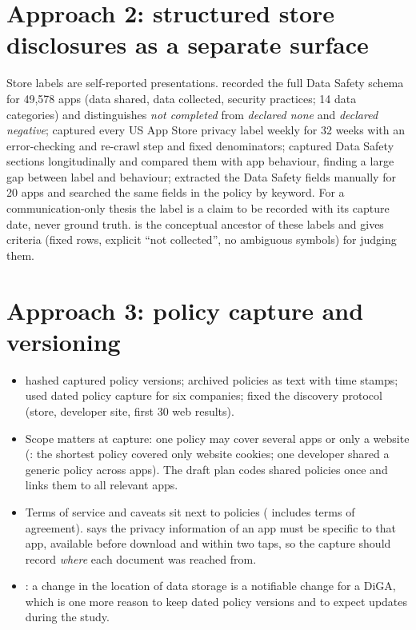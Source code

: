 \section{Approach 2: structured store disclosures as a separate surface}
Store labels are self-reported presentations.  recorded the full Data Safety schema for 49{,}578 apps (data shared, data collected, security practices; 14 data categories) and distinguishes \emph{not completed} from \emph{declared none} and \emph{declared negative};  captured every US App Store privacy label weekly for 32 weeks with an error-checking and re-crawl step and fixed denominators;  captured Data Safety sections longitudinally and compared them with app behaviour, finding a large gap between label and behaviour;  extracted the Data Safety fields manually for 20 apps and searched the same fields in the policy by keyword. For a communication-only thesis the label is a claim to be recorded with its capture date, never ground truth.  is the conceptual ancestor of these labels and gives criteria (fixed rows, explicit ``not collected'', no ambiguous symbols) for judging them.

\section{Approach 3: policy capture and versioning}
\begin{itemize}
\item {} hashed captured policy versions;  archived policies as text with time stamps;  used dated policy capture for six companies;  fixed the discovery protocol (store, developer site, first 30 web results).
\item Scope matters at capture: one policy may cover several apps or only a website (: the shortest policy covered only website cookies; one developer shared a generic policy across apps). The draft plan codes shared policies once and links them to all relevant apps.
\item Terms of service and caveats sit next to policies ( includes terms of agreement).  says the privacy information of an app must be specific to that app, available before download and within two taps, so the capture should record \emph{where} each document was reached from.
\item {}: a change in the location of data storage is a notifiable change for a DiGA, which is one more reason to keep dated policy versions and to expect updates during the study.
\end{itemize}

